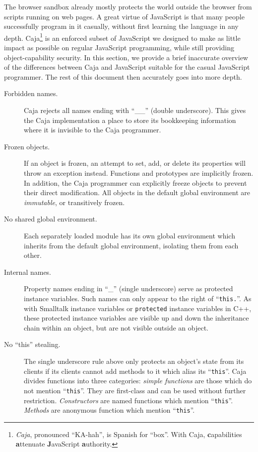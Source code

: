 \documentclass[letterpaper,twocolumn,10pt]{article}
\newcommand{\code}[1]{{\tt {#1}}}              %
\begin{document}
The browser sandbox already mostly protects the world outside the browser 
from scripts running on web pages. A great virtue of JavaScript is that many 
people successfully program in it casually, without first learning the 
language in any depth. Caja\footnote{
%
\emph{Caja}, pronounced ``KA-hah'', is Spanish for ``box''. With Caja, 
\textbf{c}apabilities \textbf{a}ttenuate \textbf{J}avaScript 
\textbf{a}uthority.
%
} is an enforced subset of JavaScript we designed to make as little impact as 
possible on regular JavaScript programming, while still providing 
object-capability security. In this section, we provide a brief inaccurate 
overview of the differences between Caja and JavaScript suitable for the 
casual JavaScript programmer. The rest of this document then accurately goes 
into more depth.

\begin{description}

  \item[Forbidden names.] Caja rejects all names ending with ``\_\_'' (double 
  underscore). This gives the Caja implementation a place to store its 
  bookkeeping information where it is invisible to the Caja programmer.
 
  \item[Frozen objects.] If an object is frozen, an attempt to set, add, or 
  delete its properties will throw an exception instead. Functions and 
  prototypes are implicitly frozen. In addition, the Caja programmer can 
  explicitly freeze objects to prevent their direct modification. All objects 
  in the default global environment are \emph{immutable}, or transitively 
  frozen.
 
  \item[No shared global environment.] Each separately loaded module has its 
  own global environment which inherits from the default global environment, 
  isolating them from each other.

  \item[Internal names.] Property names ending in ``\_'' (single underscore) 
  serve as protected instance variables. Such names can only appear to the 
  right of ``\code{this.}''. As with Smalltalk instance variables or 
  \code{protected} instance variables in C++, these protected instance 
  variables are visible up and down the inheritance chain within an object, 
  but are not visible outside an object.
 
  \item[No ``this'' stealing.] The single underscore rule above only protects 
  an object's state from its clients if its clients cannot add methods to it 
  which alias its ``\code{this}''. Caja divides functions into three 
  categories: \emph{simple functions} are those which do not mention 
  ``\code{this}''. They are first-class and can be used without further 
  restriction. \emph{Constructors} are named functions which mention 
  ``\code{this}''. \emph{Methods} are anonymous function which mention 
  ``\code{this}''.
  

\end{description}
\end{document}
